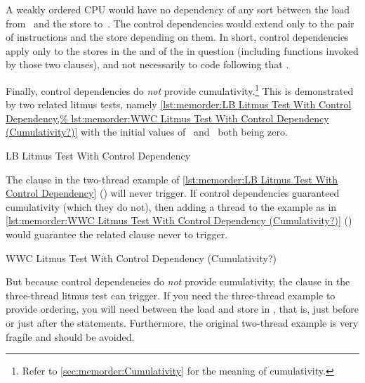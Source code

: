 A weakly ordered CPU would have no dependency of any sort between the load
from~ and the store to~.
The control dependencies would extend
only to the pair of  instructions and the store depending on them.
In short, control dependencies apply only to the stores in the 
and  of the  in question (including functions invoked by
those two clauses), and not necessarily to code following that .

Finally, control dependencies do \emph{not} provide cumulativity.\footnote{
	Refer to \cref{sec:memorder:Cumulativity} for
	the meaning of cumulativity.}
This is demonstrated by two related litmus tests, namely
\cref{lst:memorder:LB Litmus Test With Control Dependency,%
lst:memorder:WWC Litmus Test With Control Dependency (Cumulativity?)}
with the initial values
of~ and~ both being zero.

\begin{listing}

\caption{LB Litmus Test With Control Dependency}
\label{lst:memorder:LB Litmus Test With Control Dependency}
\end{listing}

The  clause in the two-thread example of
\cref{lst:memorder:LB Litmus Test With Control Dependency}
()
will never trigger.
If control dependencies guaranteed cumulativity (which they do
not), then adding a thread to the example as in
\cref{lst:memorder:WWC Litmus Test With Control Dependency (Cumulativity?)}
()
would guarantee the related  clause never to trigger.

\begin{listing}

\caption{WWC Litmus Test With Control Dependency (Cumulativity?)}
\label{lst:memorder:WWC Litmus Test With Control Dependency (Cumulativity?)}
\end{listing}

But because control dependencies do \emph{not} provide cumulativity, the
 clause in the three-thread litmus test can trigger.
If you need the three-thread example to provide ordering, you will need
 between the load and store in ,
that is, just before or just after the  statements.
Furthermore, the original two-thread example is very fragile and should be avoided.

\QuickQuizEnd

